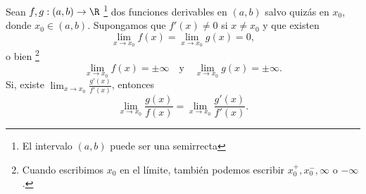 \begin{ftheorem}
\normalfont Sean $\displaystyle f,g : \left(a,b\right) \to \R $ \footnote{El intervalo $\displaystyle \left(a,b\right) $ puede ser una semirrecta}  dos funciones derivables en $\displaystyle \left(a,b\right) $ salvo quizás en $\displaystyle x_{0} $, donde $\displaystyle x_{0} \in \left(a,b\right) $. Supongamos que $\displaystyle f'\left(x\right) \neq 0 $ si $\displaystyle x \neq x_{0} $ y que existen
\[\lim_{x \to x_{0}}f\left(x\right) = \lim_{x \to x_{0}}g\left(x\right) = 0 ,\]
o bien \footnote{Cuando escribimos $\displaystyle x_{0} $ en el límite, también podemos escribir $\displaystyle x_{0}^{+}, x_{0}^{-}, \infty $ o $\displaystyle -\infty $.} 
\[ \lim_{x \to x_{0}}f\left(x\right) = \pm \infty \quad \text{y} \quad \lim_{x \to x_{0}}g\left(x\right) = \pm \infty .\]
Si, existe $\displaystyle \lim_{x \to x_{0}}\frac{g'\left(x\right)}{f'\left(x\right)} $, entonces 
\[ \lim_{x \to x_{0}}\frac{g\left(x\right)}{f\left(x\right)} = \lim_{x \to x_{0}}\frac{g'\left(x\right)}{f'\left(x\right)} .\]
\end{ftheorem}
